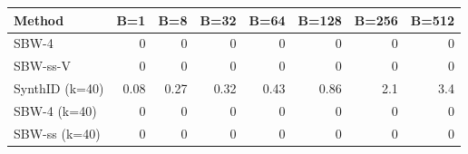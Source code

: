 \begin{tabular}{@{}l|rrrrrrr@{}}
\toprule
Method & B=1 & B=8 & B=32 & B=64 & B=128 & B=256 & B=512 \\
\midrule
SBW-4 & 0 & 0 & 0 & 0 & 0 & 0 & 0 \\
SBW-ss-V & 0 & 0 & 0 & 0 & 0 & 0 & 0 \\
\midrule
SynthID (k=40) & 0.08 & 0.27 & 0.32 & 0.43 & 0.86 & 2.1 & 3.4 \\
SBW-4 (k=40) & 0 & 0 & 0 & 0 & 0 & 0 & 0 \\
SBW-ss (k=40) & 0 & 0 & 0 & 0 & 0 & 0 & 0 \\
\bottomrule
\end{tabular}
